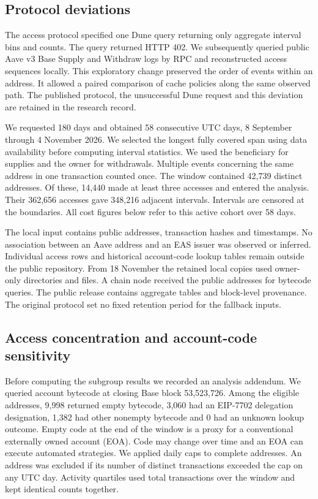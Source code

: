 \subsection{Protocol deviations}

The access protocol specified one Dune query returning only aggregate interval bins and counts. The query returned HTTP 402. We subsequently queried public Aave v3 Base Supply and Withdraw logs by RPC and reconstructed access sequences locally. This exploratory change preserved the order of events within an address. It allowed a paired comparison of cache policies along the same observed path. The published protocol, the unsuccessful Dune request and this deviation are retained in the research record.

We requested 180 days and obtained 58 consecutive UTC days, 8 September through 4 November 2026. We selected the longest fully covered span using data availability before computing interval statistics. We used the beneficiary for supplies and the owner for withdrawals. Multiple events concerning the same address in one transaction counted once. The window contained 42,739 distinct addresses. Of these, 14,440 made at least three accesses and entered the analysis. Their 362,656 accesses gave 348,216 adjacent intervals. Intervals are censored at the boundaries. All cost figures below refer to this active cohort over 58 days.

The local input contains public addresses, transaction hashes and timestamps. No association between an Aave address and an EAS issuer was observed or inferred. Individual access rows and historical account-code lookup tables remain outside the public repository. From 18 November the retained local copies used owner-only directories and files. A chain node received the public addresses for bytecode queries. The public release contains aggregate tables and block-level provenance. The original protocol set no fixed retention period for the fallback inputs.

\subsection{Access concentration and account-code sensitivity}

Before computing the subgroup results we recorded an analysis addendum. We queried account bytecode at closing Base block 53,523,726. Among the eligible addresses, 9,998 returned empty bytecode, 3,060 had an EIP-7702 delegation designation, 1,382 had other nonempty bytecode and 0 had an unknown lookup outcome. Empty code at the end of the window is a proxy for a conventional externally owned account (EOA). Code may change over time and an EOA can execute automated strategies. We applied daily caps to complete addresses. An address was excluded if its number of distinct transactions exceeded the cap on any UTC day. Activity quartiles used total transactions over the window and kept identical counts together.

